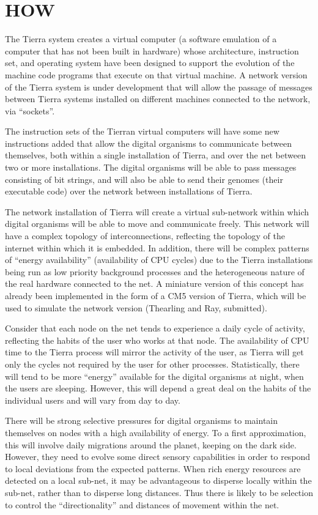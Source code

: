 \section{\bf HOW}

The Tierra system creates a virtual computer (a software emulation of
a computer that has not been built in hardware) whose architecture,
instruction set, and operating system have been designed to support
the evolution of the machine code programs that execute on that
virtual machine.  A network version of the Tierra system is under
development that will allow the passage of messages between Tierra
systems installed on different machines connected to the network,
via ``sockets''.

The instruction sets of the Tierran virtual computers will have some
new instructions added that allow the digital organisms to communicate
between themselves, both within a single installation of Tierra, and
over the net between two or more installations.  The digital organisms
will be able to pass messages consisting of bit strings, and will also
be able to send their genomes (their executable code) over the network
between installations of Tierra.

The network installation of Tierra will create a virtual sub-network
within which digital organisms will be able to move and communicate
freely.  This network will have a complex topology of interconnections,
reflecting the topology of the internet within which it is embedded.
In addition, there will be complex patterns of ``energy availability''
(availability of CPU cycles) due to the Tierra installations being run
as low priority background processes and the heterogeneous nature of the
real hardware connected to the net.  A miniature version of this
concept has already been implemented in the form of a CM5 version
of Tierra, which will be used to simulate the network version (Thearling
and Ray, submitted).

Consider that each node on the net tends to experience a daily cycle of
activity, reflecting the habits of the user who works at that node.  The
availability of CPU time to the Tierra process will mirror the activity
of the user, as Tierra will get only the cycles not required by the user
for other processes.  Statistically, there will tend to be more ``energy''
available for the digital organisms at night, when the users are sleeping.
However, this will depend a great deal on the habits of the individual
users and will vary from day to day.

There will be strong selective pressures for digital organisms to
maintain themselves on nodes with a high availability of energy.  To a
first approximation, this will involve daily migrations around the planet,
keeping on the dark side.  However, they need to evolve some direct
sensory capabilities in order to respond to local deviations from the
expected patterns.  When rich energy resources are detected on a local
sub-net, it may be advantageous to disperse locally within the sub-net,
rather than to disperse long distances.  Thus there is likely to be
selection to control the ``directionality'' and distances of movement
within the net.


